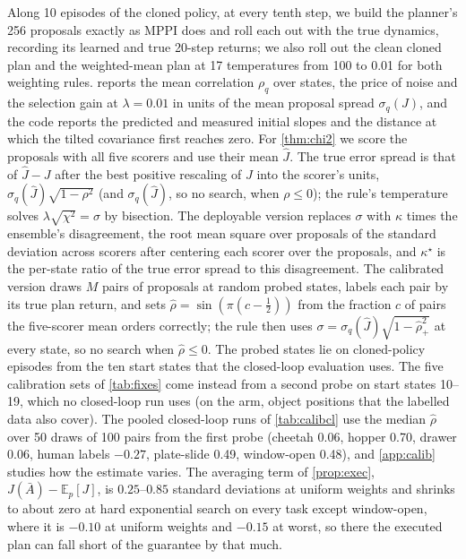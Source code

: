 \documentclass{article}
\theoremstyle{plain}
\theoremstyle{remark}
\newcommand{\E}{\mathbb{E}}
\newcommand{\Jh}{\hat{J}}
\begin{document}
Along 10 episodes of the cloned policy, at every tenth step, we build the planner's 256 proposals exactly as MPPI does
and roll each out with the true dynamics, recording its learned and true 20-step returns; we also roll out the clean
cloned plan and the weighted-mean plan at 17 temperatures from 100 to 0.01 for both weighting rules. 
reports the mean correlation $\rho_q$ over states, the price of noise and the selection gain at $\lambda=0.01$ in units
of the mean proposal spread $\sigma_q(J)$, and the code reports the predicted and measured initial slopes and the
distance at which the tilted covariance first reaches zero. For \cref{thm:chi2} we score the proposals with all five
scorers and use their mean $\Jh$. The true error spread is that of $\Jh-J$ after the best positive rescaling of $J$
into the scorer's units, $\sigma_q(\Jh)\sqrt{1-\rho^2}$ (and $\sigma_q(\Jh)$, so no search, when $\rho\le0$); the
rule's temperature solves $\lambda\sqrt{\chi^2}=\sigma$ by bisection. The deployable version replaces $\sigma$ with
$\kappa$ times the ensemble's disagreement, the root mean square over proposals of the standard deviation across
scorers after centering each scorer over the proposals, and $\kappa^\star$ is the per-state ratio of the true error
spread to this disagreement. The calibrated version draws $M$ pairs of proposals at random probed states, labels each
pair by its true plan return, and sets $\hat\rho=\sin(\pi(c-\frac12))$ from the fraction $c$ of pairs the five-scorer
mean orders correctly; the rule then uses $\sigma=\sigma_q(\Jh)\sqrt{1-\hat\rho_+^2}$ at every state, so no search when
$\hat\rho\le0$. The probed states lie on cloned-policy episodes from the ten start states that the closed-loop
evaluation uses. The five calibration sets of \cref{tab:fixes} come instead from a second probe on start states 10--19,
which no closed-loop run uses (on the arm, object positions that the labelled data also cover). The pooled closed-loop runs of \cref{tab:calibcl} use the median $\hat\rho$ over 50 draws of 100 pairs from the first probe (cheetah 0.06, hopper 0.70, drawer 0.06,
human labels $-0.27$, plate-slide 0.49, window-open 0.48), and \cref{app:calib} studies how the estimate varies. The averaging term of \cref{prop:exec},
$J(\bar A)-\E_p[J]$, is $0.25$--$0.85$ standard deviations at uniform weights and shrinks to about zero at hard
exponential search on every task except window-open, where it is $-0.10$ at uniform weights and $-0.15$ at worst, so
there the executed plan can fall short of the guarantee by that much.
\end{document}
